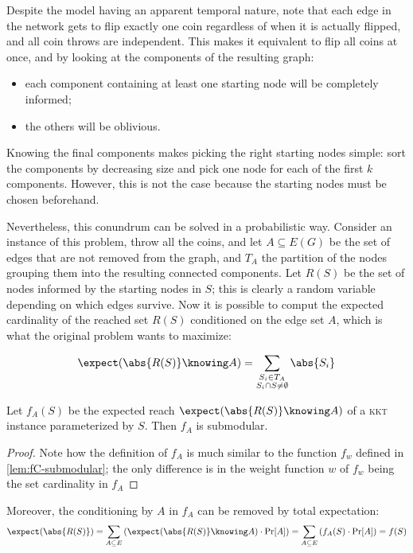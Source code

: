 Despite the model having an apparent temporal nature, note that each edge in the network gets to flip exactly one coin regardless of when it is actually flipped, and all coin throws are independent. This makes it equivalent to flip all coins at once, and by looking at the components of the resulting graph:
\begin{itemize}
    \item each component containing at least one starting node will be completely informed;
    \item the others will be oblivious.
\end{itemize}

Knowing the final components makes picking the right starting nodes simple: sort the components by decreasing size and pick one node for each of the first $k$ components. However, this is not the case because the starting nodes must be chosen beforehand.

Nevertheless, this conundrum can be solved in a probabilistic way. Consider an instance of this problem, throw all the coins, and let $A \subseteq E(G)$ be the set of edges that are not removed from the graph, and $T_A$ the partition of the nodes grouping them into the resulting connected components. Let $R(S)$ be the set of nodes informed by the starting nodes in $S$; this is clearly a random variable depending on which edges survive. Now it is possible to comput the expected cardinality of the reached set $R(S)$ conditioned on the edge set $A$, which is what the original problem wants to maximize:

\[
    \expect(\abs{R(S)} \knowing A) = \sum_{\substack{S_i \in T_A \\ S_i \cap S \neq \emptyset}} \abs{S_i}
\]

\begin{claim}
    Let $f_A(S)$ be the expected reach $\expect(\abs{R(S)} \knowing A)$ of a \textsc{kkt} instance parameterized by $S$. Then $f_A$ is submodular. 
\end{claim}

\begin{proof}
    Note how the definition of $f_A$ is much similar to the function $f_w$ defined in \ref{lem:fC-submodular}; the only difference is in the weight function $w$ of $f_w$ being the set cardinality in $f_A$
\end{proof}

Moreover, the conditioning by $A$ in $f_A$ can be removed by total expectation:
\begin{equation}\label{eq:sub-fs}
    \expect(\abs{R(S)}) = \sum_{A \subseteq E} \left( \expect(\abs{R(S)} \knowing A) \cdot \Pr[A] \right) = \sum_{A \subseteq E} \left( f_A(S) \cdot \Pr[A] \right) = f(S)
\end{equation}

